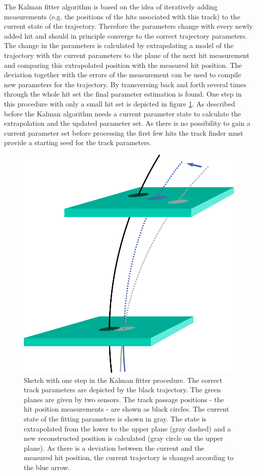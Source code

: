 The Kalman fitter algorithm \cite{kalman} is based on the idea of iteratively adding measurements (e.g. the positions of the hits associated with this track) to the current state of the trajectory. Therefore the parameters change with every newly added hit and should in principle converge to the correct trajectory parameters. The change in the parameters is calculated by extrapolating a model of the trajectory with the current parameters to the plane of the next hit measurement and comparing this extrapolated position with the measured hit position. The deviation together with the errors of the measurement can be used to compile new parameters for the trajectory. By transversing back and forth several times through the whole hit set the final parameter estimation is found. One step in this procedure with only a small hit set is depicted in figure \ref{fig-kalman}. As described before the Kalman algorithm needs a current parameter state to calculate the extrapolation and the updated parameter set. As there is no possibility to gain a current parameter set before processing the first few hits the track finder must provide a starting seed for the track parameters.

\begin{figure}
 \centering
 \includegraphics[width=0.5\linewidth]{figures/theory/kalman.pdf}
 \caption[One step of the Kalman fitter procedure.]{Sketch with one step in the Kalman fitter procedure. The correct track parameters are depicted by the black trajectory. The green planes are given by two sensors. The track passage positions - the hit position measurements - are shown as black circles. The current state of the fitting parameters is shown in gray. The state is extrapolated from the lower to the upper plane (gray dashed) and a new reconstructed position is calculated (gray circle on the upper plane). As there is a deviation between the current and the measured hit position, the current trajectory is changed according to the blue arrow.}
 \label{fig-kalman}
\end{figure}

